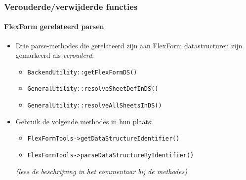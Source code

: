 \begin{frame}[fragile]
	\frametitle{Verouderde/verwijderde functies}
	\framesubtitle{FlexForm gerelateerd parsen}

	\begin{itemize}
		\item Drie parse-methodes die gerelateerd zijn aan FlexForm datastructuren zijn gemarkeerd als \textit{verouderd}:

			\begin{itemize}
				\item \texttt{BackendUtility::getFlexFormDS()}
				\item \texttt{GeneralUtility::resolveSheetDefInDS()}
				\item \texttt{GeneralUtility::resolveAllSheetsInDS()}
			\end{itemize}

		\item Gebruik de volgende methodes in hun plaats:

			\begin{itemize}
				\item \texttt{FlexFormTools->getDataStructureIdentifier()}
				\item \texttt{FlexFormTools->parseDataStructureByIdentifier()}
			\end{itemize}

		\small
			\textit{(lees de beschrijving in het commentaar bij de methodes)}
		\normalsize

	\end{itemize}

\end{frame}







